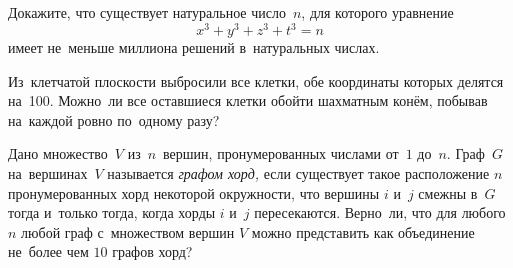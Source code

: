 \begin{problems}
\item
Докажите, что существует натуральное число~$n$, для которого уравнение
\[ x^3 + y^3 + z^3 + t^3 = n \]
имеет не~меньше миллиона решений в~натуральных числах.

\item
Из~клетчатой плоскости выбросили все клетки, обе координаты которых делятся
на~100.
Можно~ли все оставшиеся клетки обойти шахматным конём, побывав на~каждой ровно
по~одному разу?

\item
Дано множество~$V$ из~$n$~вершин, пронумерованных числами от~$1$ до~$n$.
Граф~$G$ на~вершинах~$V$ называется \emph{графом хорд,} если существует такое
расположение $n$ пронумерованных хорд некоторой окружности, что вершины
$i$ и~$j$ смежны в~$G$ тогда и~только тогда, когда хорды $i$ и~$j$
пересекаются.
Верно~ли, что для любого $n$ любой граф с~множеством вершин $V$ можно
представить как объединение не~более чем $10$ графов хорд?

\end{problems}

